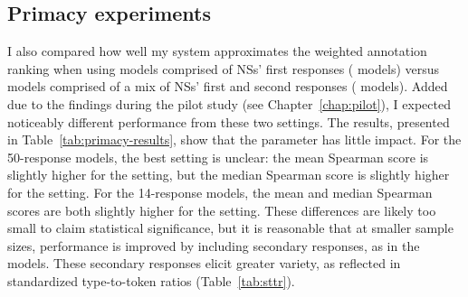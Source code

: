 \subsection{Primacy experiments}
\label{sec:exp-primacy}
I also compared how well my system approximates the weighted annotation ranking when using models comprised of NSs' first responses ( models) versus models comprised of a mix of NSs' first and second responses ( models). Added due to the findings during the pilot study (see Chapter~\ref{chap:pilot}), I expected noticeably different performance from these two settings. The results, presented in Table~\ref{tab:primacy-results}, show that the parameter has little impact. For the 50-response models, the best setting is unclear: the mean Spearman score is slightly higher for the  setting, but the median Spearman score is slightly higher for the  setting. For the 14-response models, the mean and median Spearman scores are both slightly higher for the  setting. These differences are likely too small to claim statistical significance, but it is reasonable that at smaller sample sizes, performance is improved by including secondary responses, as in the  models. These secondary responses elicit greater variety, as reflected in standardized type-to-token ratios (Table~\ref{tab:sttr}).


